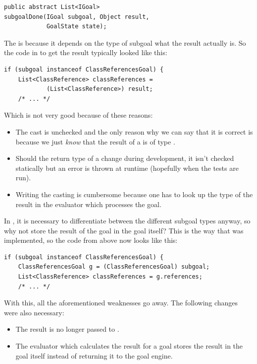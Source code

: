 \documentclass[12pt,halfparskip,DIV11,BCOR10mm]{scrreprt}
\begin{document}
\begin{lstlisting}[style=java]
public abstract List<IGoal>
subgoalDone(IGoal subgoal, Object result,
            GoalState state);
\end{lstlisting}

The  is  because it depends on the type of subgoal what the result actually is. So the code in  to get the result typically looked like this:

\begin{lstlisting}[style=java]
if (subgoal instanceof ClassReferencesGoal) {
    List<ClassReference> classReferences =
            (List<ClassReference>) result;
    /* ... */
\end{lstlisting}

Which is not very good because of these reasons:

\begin{itemize}
	\item The cast is unchecked and the only reason why we can say that it is correct is because we just \emph{know} that the result of a  is of type .
	\item Should the return type of a  change during development, it isn't checked statically but an error is thrown at runtime (hopefully when the tests are run).
	\item Writing the casting is cumbersome because one has to look up the type of the result in the evaluator which processes the goal.
\end{itemize}

In , it is necessary to differentiate between the different subgoal types anyway, so why not store the result of the goal in the goal itself? This is the way that was implemented, so the code from above now looks like this:

\begin{lstlisting}[style=java]
if (subgoal instanceof ClassReferencesGoal) {
    ClassReferencesGoal g = (ClassReferencesGoal) subgoal;
    List<ClassReference> classReferences = g.references;
    /* ... */
\end{lstlisting}

With this, all the aforementioned weaknesses go away. The following changes were also necessary:

\begin{itemize}
	\item The result is no longer passed to .
	\item The evaluator which calculates the result for a goal stores the result in the goal itself instead of returning it to the goal engine.
\end{itemize}
\end{document}
